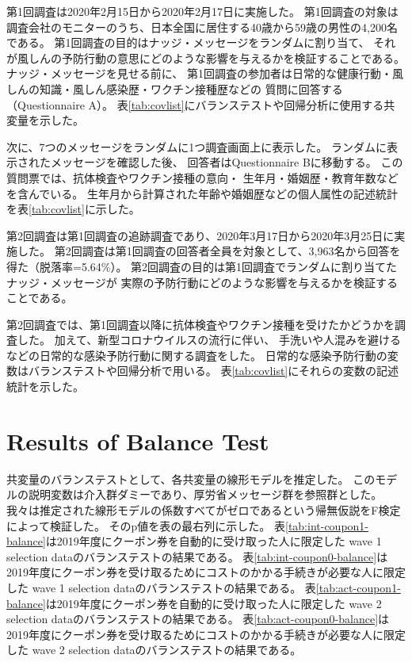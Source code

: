 \documentclass[
  11pt,
  a4paper,
]{article}
\begin{document}
第1回調査は2020年2月15日から2020年2月17日に実施した。
第1回調査の対象は調査会社のモニターのうち、日本全国に居住する40歳から59歳の男性の4,200名である。
第1回調査の目的はナッジ・メッセージをランダムに割り当て、
それが風しんの予防行動の意思にどのような影響を与えるかを検証することである。
ナッジ・メッセージを見せる前に、
第1回調査の参加者は日常的な健康行動・風しんの知識・風しん感染歴・ワクチン接種歴などの
質問に回答する（Questionnaire A）。
表\ref{tab:covlist}にバランステストや回帰分析に使用する共変量を示した。

次に、7つのメッセージをランダムに1つ調査画面上に表示した。
ランダムに表示されたメッセージを確認した後、
回答者はQuestionnaire Bに移動する。
この質問票では、抗体検査やワクチン接種の意向・
生年月・婚姻歴・教育年数などを含んでいる。
生年月から計算された年齢や婚姻歴などの個人属性の記述統計を表\ref{tab:covlist}に示した。

第2回調査は第1回調査の追跡調査であり、2020年3月17日から2020年3月25日に実施した。
第2回調査は第1回調査の回答者全員を対象として、3,963名から回答を得た（脱落率=5.64\%）。
第2回調査の目的は第1回調査でランダムに割り当てたナッジ・メッセージが
実際の予防行動にどのような影響を与えるかを検証することである。

第2回調査では、第1回調査以降に抗体検査やワクチン接種を受けたかどうかを調査した。
加えて、新型コロナウイルスの流行に伴い、
手洗いや人混みを避けるなどの日常的な感染予防行動に関する調査をした。
日常的な感染予防行動の変数はバランステストや回帰分析で用いる。
表\ref{tab:covlist}にそれらの変数の記述統計を示した。

\clearpage

\hypertarget{results-of-balance-test}{%
\section{Results of Balance Test}\label{results-of-balance-test}}

共変量のバランステストとして、各共変量の線形モデルを推定した。
このモデルの説明変数は介入群ダミーであり、厚労省メッセージ群を参照群とした。
我々は推定された線形モデルの係数すべてがゼロであるという帰無仮説をF検定によって検証した。
そのp値を表の最右列に示した。
表\ref{tab:int-coupon1-balance}は2019年度にクーポン券を自動的に受け取った人に限定した
wave 1 selection dataのバランステストの結果である。
表\ref{tab:int-coupon0-balance}は
2019年度にクーポン券を受け取るためにコストのかかる手続きが必要な人に限定した
wave 1 selection dataのバランステストの結果である。
表\ref{tab:act-coupon1-balance}は2019年度にクーポン券を自動的に受け取った人に限定した
wave 2 selection dataのバランステストの結果である。
表\ref{tab:act-coupon0-balance}は
2019年度にクーポン券を受け取るためにコストのかかる手続きが必要な人に限定した
wave 2 selection dataのバランステストの結果である。
\end{document}
